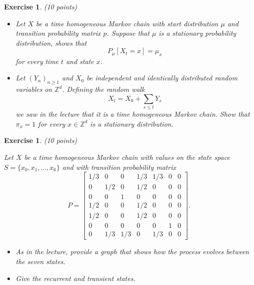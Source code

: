 \documentclass[DIV=classic,a4paper,10pt]{scrartcl}
\newtheorem{exercise}[theorem]{Exercise}
\theoremstyle{nonumberplain}
\numberwithin{equation}{section}
\begin{document}
\begin{exercise}(10 points)

    \begin{itemize}[fullwidth]
        \item Let $X$ be a time homogeneous Markov chain with start distribution $\mu$ and transition probability matrix $p$.
            Suppose that $\mu$ is a stationary probability distribution, shows that
            \begin{equation*}
                P_{\mu}\left[ X_t=x \right]=\mu_x
            \end{equation*}
            for every time $t$ and state $x$.
        \item Let $(Y_n)_{n\geq 1}$ and $X_0$ be independent and identically distributed random variables on $\mathbb{Z}^d$.
            Defining the random walk
            \begin{equation*}
                X_t=X_0+\sum_{s\leq t}Y_s
            \end{equation*}
            we saw in the lecture that it is a time homogeneous Markov chain.
            Show that $\pi_x= 1$ for every $x \in \mathbb{Z}^d$ is a stationary distribution.
    \end{itemize}
\end{exercise}
\begin{exercise}(10 points)

    Let $X$ be a time homogeneous Markov chain with values on the state space $S=\{x_0,x_1,\ldots,x_6\}$ and with transition probability matrix
    \begin{equation*}
        P = 
        \begin{bmatrix} 
            1/3 & 0   & 0   & 1/3 & 1/3 & 0 & 0\\
            0   & 1/2 & 0   & 1/2 & 0   & 0 & 0\\
            0   & 0   & 1   & 0   & 0   & 0 & 0 \\
            1/2 & 0   & 0   & 1/2 & 0   & 0 & 0 \\
            1/2 & 0   & 0   & 1/2 & 0   & 0 & 0 \\
            0   & 0   & 0   & 0   & 0   & 1 & 0 \\
            0   & 1/3 & 1/3 & 0   & 1/3 & 0 & 0
        \end{bmatrix}. 
    \end{equation*}
    \begin{itemize}
        \item As in the lecture, provide a graph that shows how the process evolves between the seven states.
        \item Give the recurrent and transient states.
    \end{itemize}
\end{exercise}
\end{document}
